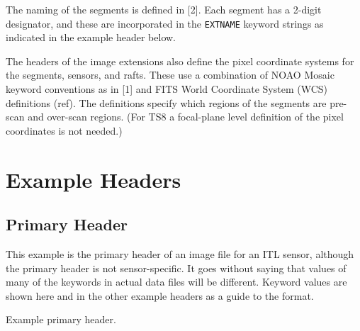 \documentclass{article}[12pt]
\newcommand{\red}{\textcolor{red}}
\begin{document}
The naming of the segments is defined in [2].  Each segment has a 2-digit designator, and these are incorporated in the {\tt EXTNAME} keyword strings as indicated in the example header below.

The headers of the image extensions also define the pixel coordinate systems for the segments, sensors, and rafts.  These use a combination of NOAO Mosaic keyword conventions as in [1] and FITS World Coordinate System (WCS) definitions (ref).  The definitions specify which regions of the segments are pre-scan and over-scan regions.  (For TS8 a focal-plane level definition of the pixel coordinates is not needed.)

\section{Example Headers}

\subsection{Primary Header}
This example is the primary header of an image file for an ITL sensor, although the primary header is not sensor-specific.  It goes without saying that values of many of the keywords in actual data files will be different.  Keyword values are shown here and in the other example headers as a guide to the format.


\begin{table}
\begin{alltt}

\end{alltt}
\caption{Example primary header.\label{tab:primary}}
\end{table}
\end{document}
